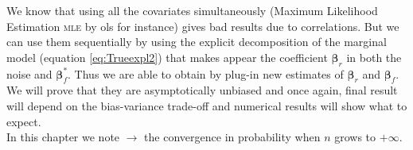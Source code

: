 \documentclass[12pt,a4paper]{report}
\begin{document}
		We know that using all the covariates simultaneously (Maximum Likelihood Estimation \textsc{mle} by {\sc ols} for instance) gives bad results due to correlations. But we can use them sequentially by using the explicit decomposition of the marginal model (equation \ref{eq:Trueexpl2}) that makes appear the coefficient $\boldsymbol{\beta}_r$ in both the noise and $\boldsymbol{\beta}_f^*$. Thus we are able to obtain by plug-in new estimates of $\boldsymbol{\beta}_r$ and $\boldsymbol{\beta}_f$. We will prove that they are asymptotically unbiased and once again, final result will depend on the bias-variance trade-off and numerical results will show what to expect.\\
		
		In this chapter we note $\longrightarrow$ the convergence in probability when $n$ grows to $+\infty$.
		\newpage
\end{document}
